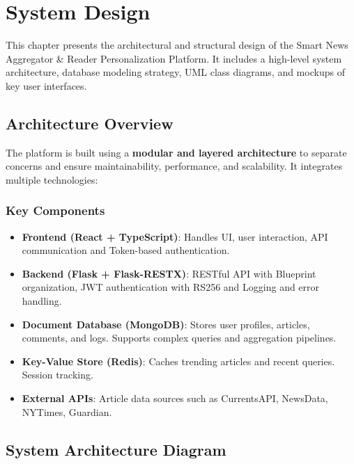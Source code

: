 

\chapter{System Design}\label{ch:system-design}


This chapter presents the architectural and structural design of the Smart News Aggregator \& Reader Personalization Platform.
It includes a high-level system architecture, database modeling strategy, UML class diagrams, and mockups of key user interfaces.


\section{Architecture Overview}\label{sec:architecture-overview}

The platform is built using a \textbf{modular and layered architecture} to separate concerns and ensure maintainability, performance, and scalability.
It integrates multiple technologies:

\subsection{Key Components}\label{subsec:key-components}

\begin{itemize}
    \item \textbf{Frontend (React\cite{react, vite} + TypeScript)}: Handles UI, user interaction, API communication and Token-based authentication.
    \item \textbf{Backend (Flask + Flask-RESTX)}: RESTful API with Blueprint organization, JWT authentication with RS256 and Logging and error handling.
    \item \textbf{Document Database (MongoDB)}: Stores user profiles, articles, comments, and logs.
    Supports complex queries and aggregation pipelines.
    \item \textbf{Key-Value Store (Redis)}: Caches trending articles and recent queries.
    Session tracking.
    \item \textbf{External APIs}: Article data sources such as CurrentsAPI, NewsData, NYTimes, Guardian.
\end{itemize}


\section{System Architecture Diagram}\label{sec:system-architecture-diagram}

